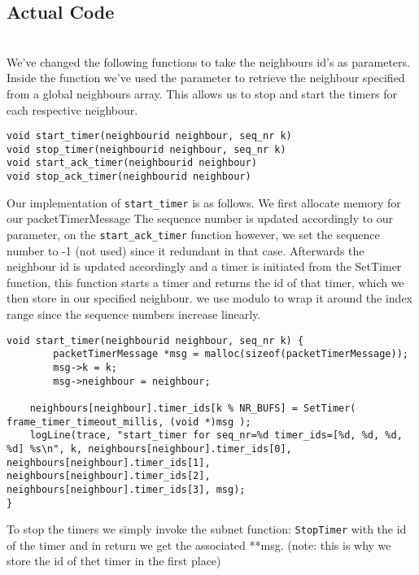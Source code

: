 \hfill \break
\subsection{Actual Code}
\\



We've changed the following functions to take the neighbours id's as parameters.
Inside the function we've used the parameter to retrieve the neighbour specified from a global neighbours array.
This allows us to stop and start the timers for each respective neighbour.

\begin{lstlisting}
void start_timer(neighbourid neighbour, seq_nr k)
void stop_timer(neighbourid neighbour, seq_nr k)
void start_ack_timer(neighbourid neighbour)
void stop_ack_timer(neighbourid neighbour)
\end{lstlisting}

Our implementation of \texttt{start\_timer} is as follows. We first allocate memory for our {packetTimerMessage}
The sequence number is updated accordingly to our parameter, on the \texttt{start\_ack\_timer} function however, we set the sequence number to -1 (not used) since it redundant in that case.
Afterwards the neighbour id is updated accordingly and a timer is initiated from the SetTimer function, this function starts a timer and returns the id of that timer,
which we then store in our specified neighbour.
we use modulo to wrap it around the index range since the sequence numbers increase linearly.
\begin{lstlisting}
void start_timer(neighbourid neighbour, seq_nr k) {
        packetTimerMessage *msg = malloc(sizeof(packetTimerMessage));
        msg->k = k;
        msg->neighbour = neighbour;

	neighbours[neighbour].timer_ids[k % NR_BUFS] = SetTimer( frame_timer_timeout_millis, (void *)msg );
	logLine(trace, "start_timer for seq_nr=%d timer_ids=[%d, %d, %d, %d] %s\n", k, neighbours[neighbour].timer_ids[0], neighbours[neighbour].timer_ids[1], neighbours[neighbour].timer_ids[2], neighbours[neighbour].timer_ids[3], msg);
}
\end{lstlisting}

To stop the timers we simply invoke the subnet function: \texttt{StopTimer} with the id of the timer
and in return we get the associated **msg. (note: this is why we store the id of thet timer in the first place)
\\

